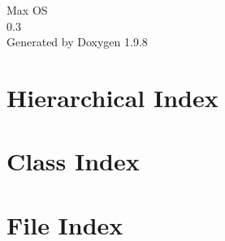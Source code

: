 \documentclass[twoside]{book}
\newcommand{\+}{\discretionary{\mbox{\scriptsize$\hookleftarrow$}}{}{}}
\newcommand{\clearemptydoublepage}{%
    \newpage{\pagestyle{empty}\cleardoublepage}%
  }
\begin{document}
  \raggedbottom
    \hypersetup{pageanchor=false,
                bookmarksnumbered=true,
                pdfencoding=unicode
               }
  \begin{titlepage}
  \vspace*{7cm}
  \begin{center}%
  {\Large Max OS}\\
  [1ex]\large 0.\+3 \\
  \vspace*{1cm}
  {\large Generated by Doxygen 1.9.8}\\
  \end{center}
  \end{titlepage}
  \clearemptydoublepage
  \tableofcontents
  \clearemptydoublepage
  \hypersetup{pageanchor=true}


\chapter{Hierarchical Index}

\chapter{Class Index}

\chapter{File Index}

\end{document}
